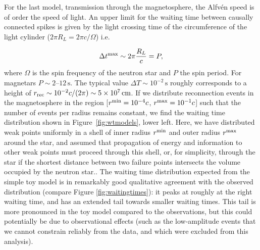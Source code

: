 \documentclass[12pt]{emulateapj}
\begin{document}
For the last model, transmission through the magnetosphere, the Alfv\'en speed is of order the speed of light. An upper limit for the waiting time between 
causally connected spikes is given by the light crossing time of the circumference of the light cylinder ($2\pi R_L=2 \pi c/\Omega$) i.e.

\begin{equation}\label{eq}
\Delta t^{\rm max}\sim2\pi \frac{R_L}{c}=P,
\end{equation}
where $\Omega$ is the spin frequency of the neutron star and $P$ the spin period. For magnetars $P\sim2$--$12\,\mathrm{s}$. The typical 
value $\Delta T\sim10^{-2}\,\mathrm{s}$ roughly corresponds to a height of $r_{\rm rec}\sim10^{-2} c/(2\pi)\sim5\times10^7\,\mathrm{cm}$. 
If we distribute reconnection events in the magnetosphere in the region [$r^{\rm min}=10^{-4}c$, $r^{\rm max}=10^{-1}c$] such that the number 
of events per radius remains constant, we find the waiting time distribution shown in Figure~\ref{fig:wtmodels}, lower left. Here, we have distributed 
weak points uniformly in a shell of inner radius $r^{\rm min}$ and outer radius $r^{\rm max}$ around the star, and assumed that propagation of 
energy and information to other weak points must proceed through this shell, or, for simplicity, through the star if the shortest distance between
two failure points intersects the volume occupied by the neutron star.. 
The waiting time distribution expected from the simple toy model is 
in remarkably good qualitative agreement with the observed distribution (compare Figure \ref{fig:waitingtimes}): it peaks at roughly at the right 
waiting time, and has an extended tail towards smaller waiting times. This tail is more pronounced in the toy model compared to the observations, 
but this could potentially be due to observational effects (such as the low-amplitude events that we cannot constrain reliably from the data, and 
which were excluded from this analysis). 
\end{document}
